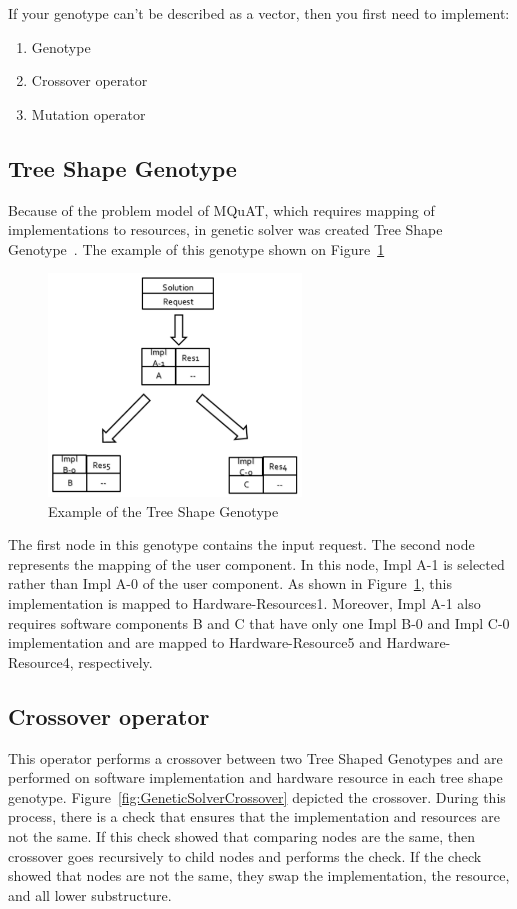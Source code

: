 If your genotype can't be described as a vector, then you first need to implement:
\begin{enumerate}
	\item Genotype
	\item Crossover operator
	\item Mutation operator
\end{enumerate}

\subsection{Tree Shape Genotype}
Because of the problem model of MQuAT, which requires mapping of implementations to resources, in genetic solver was created Tree Shape Genotype~\cite{ahmad18}.
The example of this genotype shown on Figure~\ref{fig:TreeShapeGenotypeExample}

\begin{figure}
	\centering
	\includegraphics[width=0.6\textwidth]{images/TreeShapeGenotypeExample.png}
	\caption[Example of the Tree Shape Genotype]{Example of the Tree Shape Genotype}
	\label{fig:TreeShapeGenotypeExample}
\end{figure}

The first node in this genotype contains the input request. The second node represents the mapping of the user component. In this node, Impl A-1 is selected rather than Impl A-0 of the user component. As shown in Figure~\ref{fig:TreeShapeGenotypeExample}, this implementation is mapped to Hardware-Resources1. Moreover, Impl A-1 also requires software components B and C that have only one Impl B-0 and Impl C-0 implementation and are mapped to Hardware-Resource5 and Hardware-Resource4, respectively.

\subsection{Crossover operator}
This operator performs a crossover between two Tree Shaped Genotypes and are performed on software implementation and hardware resource in each tree shape genotype. Figure~\ref{fig:GeneticSolverCrossover} depicted the crossover. 
During this process, there is a check that ensures that the implementation and resources are not the same. If this check showed that comparing nodes are the same, then crossover goes recursively to child nodes and performs the check.
If the check showed that nodes are not the same, they swap the implementation, the resource, and all lower substructure.

